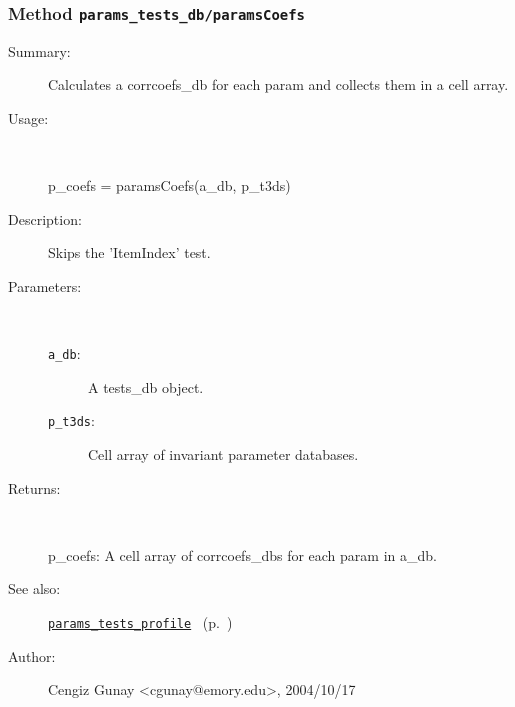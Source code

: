 \subsubsection[Method \texttt{paramsCoefs}]{Method \texttt{params\_tests\_db/paramsCoefs}}%
%
\label{ref_params_tests_db__paramsCoefs}%
\hypertarget{ref_params_tests_db__paramsCoefs}{}%
\begin{description}
\item[Summary:]Calculates a corrcoefs\_db for each param and collects them in a cell array.
%
\item[Usage:]~%
\begin{lyxcode}%
p\_coefs = paramsCoefs(a\_db, p\_t3ds)
%
\end{lyxcode}%
%
\item[Description:]%
Skips the 'ItemIndex' test.
\item[Parameters:]~
\begin{description}%
\item[\texttt{a\_db}:]
 A tests\_db object.
\item[\texttt{p\_t3ds}:]
 Cell array of invariant parameter databases.
\end{description}%
%
\item[Returns:]~

	p\_coefs: A cell array of corrcoefs\_dbs for each param in a\_db.
%
%
\item[See also:]%
\hyperlink{ref_params_tests_profile}{\texttt{params\_tests\_profile}}%
\ (p.~\pageref{ref_params_tests_profile})%
%
%
\item[Author:]%
Cengiz Gunay <cgunay@emory.edu>, 2004/10/17%
\end{description}
\methodline%
